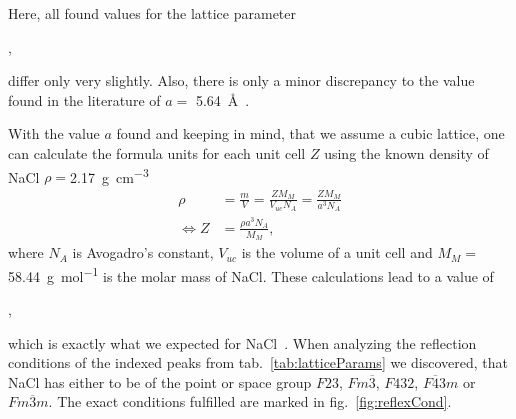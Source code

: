 Here, all found values for the lattice parameter \par  
\centerline{,} \par 
differ only very slightly. Also, there is only a minor discrepancy to the value found in the literature of $a =$ \SI{5.64}{\angstrom}~\cite{Toreki2020}.  \par 
With the value $a$ found and keeping in mind, that we assume a cubic lattice, one can calculate the formula units for each unit cell $Z$ using the known density of NaCl $\rho = $\SI{2.17}{\gram \per \centi\metre^3} 
\begin{align}
    \rho &= \frac{m}{V} = \frac{Z M_M}{V_{uc}N_A} = \frac{Z M_M}{a^3 N_A} \\
    \Leftrightarrow Z &= \frac{\rho a^3 N_A}{M_M},
\end{align}
where $N_A$ is Avogadro's constant, $V_{uc}$ is the volume of a unit cell and $M_M =$\SI{58.44}{\gram \per \mol} is the molar mass of NaCl. These calculations lead to a value of \par 
\centerline{,} \par 
which is exactly what we expected for NaCl~\cite{Toreki2020}. When analyzing the reflection conditions of the indexed peaks from tab.~\ref{tab:latticeParams} we discovered, that NaCl has either to be of the point or space group $F23$, $Fm\overline{3}$, $F432$, $F\overline{4}3m$ or $Fm\overline{3}m$. The exact conditions fulfilled are marked in fig.~\ref{fig:reflexCond}.


